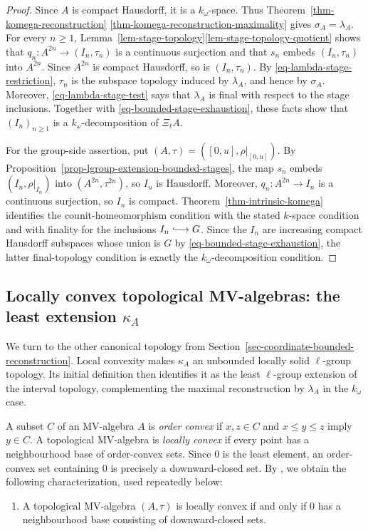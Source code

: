 \documentclass[preprint,3p]{elsarticle}
\theoremstyle{plain}
\theoremstyle{definition}
\newcommand{\longhookrightarrow}{\lhook\joinrel\longrightarrow}
\numberwithin{equation}{section}
\begin{document}
\begin{proof}
Since $A$ is compact Hausdorff, it is a $k_\omega$-space.
Thus Theorem~\ref{thm-komega-reconstruction}%
\ref{thm-komega-reconstruction-maximality}
gives $\sigma_A=\lambda_A$.  For every $n\geq1$,
Lemma~\ref{lem-stage-topology}\ref{lem-stage-topology-quotient}
shows that $q_n\colon A^{2n}\longrightarrow(I_n,\tau_n)$ is a
continuous surjection and that $s_n$ embeds $(I_n,\tau_n)$ into
$A^{2n}$.  Since $A^{2n}$ is compact Hausdorff, so is
$(I_n,\tau_n)$.  By \eqref{eq-lambda-stage-restriction}, $\tau_n$
is the subspace topology induced by $\lambda_A$,
and hence by $\sigma_A$.
Moreover, \eqref{eq-lambda-stage-test} says that $\lambda_A$ is
final with respect to the stage inclusions.  Together with
\eqref{eq-bounded-stage-exhaustion}, these facts show that
$(I_n)_{n\geq1}$ is a $k_\omega$-decomposition of $\Xi_tA$.

For the group-side assertion, put
$(A,\tau)=([0,u],\rho|_{[0,u]})$.
By Proposition~\ref{prop-lgroup-extension-bounded-stages},
the map $s_n$ embeds $(I_n,\rho|_{I_n})$ into
$(A^{2n},\tau^{2n})$, so $I_n$ is Hausdorff.
Moreover, $q_n\colon A^{2n}\longrightarrow I_n$
is a continuous surjection, so $I_n$ is compact.
Theorem~\ref{thm-intrinsic-komega} identifies the
counit-homeomorphism condition with the stated $k$-space
condition and with finality for the inclusions
$I_n\longhookrightarrow G$.
Since the $I_n$ are increasing compact Hausdorff
subspaces whose union is $G$ by
\eqref{eq-bounded-stage-exhaustion},
the latter final-topology condition is exactly the
$k_\omega$-decomposition condition.
\end{proof}

\subsection{Locally convex topological MV-algebras:
the least extension \texorpdfstring{$\kappa_A$}{kappa\_A}}
\label{sec-locally-convex}

We turn to the other canonical topology from
Section~\ref{sec-coordinate-bounded-reconstruction}.  Local convexity
makes $\kappa_A$ an unbounded locally solid $\ell$-group topology.
Its initial definition then identifies it as the least $\ell$-group
extension of the interval topology, complementing the maximal
reconstruction by $\lambda_A$ in the $k_\omega$ case.

A subset $C$ of an MV-algebra $A$ is \emph{order convex} if
$x,z\in C$ and $x\leq y\leq z$ imply $y\in C$.  A topological
MV-algebra is \emph{locally convex} if every point has a neighbourhood
base of order-convex sets.  Since $0$ is the least element, an
order-convex set containing $0$ is precisely a downward-closed set.
By \cite[Proposition~2.3]{Weber2012}, we obtain the following
characterization, used repeatedly below:
\begin{enumerate}[label=(LC),ref=(LC)]
\item\label{lc-zero-neighbourhood-base}
A topological MV-algebra $(A,\tau)$ is locally convex if and only if
$0$ has a neighbourhood base consisting of downward-closed sets.
\end{enumerate}
\end{document}
